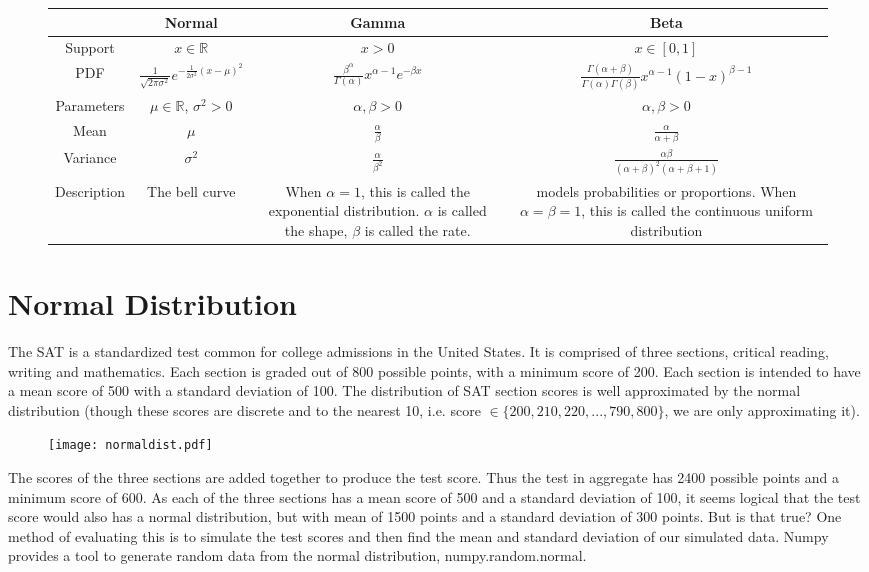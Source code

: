 \begin{figure}[h]
\begin{center}
\begin{tabular}{|c|c|c|c|}
	\hline
 & Normal& Gamma&Beta\\ \hline \hline
Support &$x \in \mathbb{R}$ & $x>0$ &$x \in [0,1]$\\  \hline
PDF & $\frac{1}{\sqrt{2\pi \sigma^2}} e^{-\frac{1}{2\sigma^2}(x-\mu)^2}$ & $\frac{\beta^\alpha}{\Gamma(\alpha)} x^{\alpha -1} e^{-\beta x}$ &$\frac{\Gamma(\alpha+\beta)}{\Gamma(\alpha)\Gamma(\beta)} x^{\alpha-1} (1-x)^{\beta-1}$\\  \hline
Parameters & $\mu \in \mathbb{R}$, $\sigma^2 > 0$ & $\alpha,\beta>0$ &$\alpha,\beta>0$\\  \hline
Mean &  $\mu$& $\frac{\alpha}{\beta}$ &$\frac{\alpha}{\alpha + \beta}$\\  \hline
Variance &$\sigma^2$& $\frac{\alpha}{\beta^2}$&$\frac{\alpha \beta}{(\alpha + \beta)^2(\alpha + \beta +1)}$\\ \hline
Description&The bell curve&\parbox{1in}{When $\alpha=1$, this is called the exponential distribution. $\alpha$ is called the shape, $\beta$ is called the rate.}&\parbox{1in}{models probabilities or proportions. When $\alpha = \beta =1$, this is called the continuous uniform distribution}\\
\hline
\end{tabular}
\end{center}
\end{figure}

\section*{Normal Distribution}
The SAT is a standardized test common for college admissions in the United States. 
It is comprised of three sections, critical reading, writing and mathematics. 
Each section is graded out of 800 possible points, with a minimum score of 200.
Each section is intended to have a mean score of 500 with a standard deviation of 100.  
The distribution of SAT section scores is well approximated by the normal distribution 
(though these scores are discrete and to the nearest 10, i.e. score $\in \{200,210,220,...,790,800\}$, we are only approximating it). 

\begin{figure}[h]
\centering
\texttt{[image: normaldist.pdf]}
\end{figure}

The scores of the three sections are added together to produce the test score. 
Thus the test in aggregate has 2400 possible points and a minimum score of 600.  
As each of the three sections has a mean score of 500 and a standard deviation of 100, it seems logical that the test score would also has a normal distribution, 
but with mean of 1500 points and a standard deviation of 300 points. 
But is that true? One method of evaluating this is to simulate the test scores and then find the mean and standard deviation of our simulated data. 
Numpy provides a tool to generate random data from the normal distribution, numpy.random.normal.

